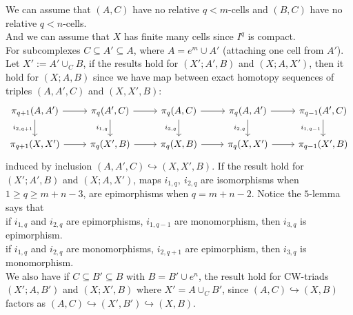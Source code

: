 \begin{prf}
        We can assume that $(A,C)$ have no relative $q<m$-cells and
        $(B,C)$ have no relative $q<n$-cells.\\
        And we can assume that $X$ has finite many cells
        since $I^q$ is compact.\\
        For subcomplexes $C \subseteq A' \subseteq A$,
        where $A = e^m \cup A'$ (attaching one cell from $A'$).\\
        Let $X' := A' \cup_C B$,
        if the results hold for $(X';A',B)$ and $(X;A,X')$,
        then it hold for $(X;A,B)$ since we have
        map between exact homotopy sequences of triples
        $(A,A',C)$ and  $(X,X',B)$:
        \[\begin{tikzcd}
            {\pi_{q+1}(A,A')} & {\pi_q(A',C)} & {\pi_q(A,C)} & {\pi_q(A,A')} & {\pi_{q-1}(A',C)} \\
            {\pi_{q+1}(X,X')} & {\pi_q(X',B)} & {\pi_q(X,B)} & {\pi_q(X,X')} & {\pi_{q-1}(X',B)}
            \arrow["{i_{2,q+1}}"', from=1-1, to=2-1]
            \arrow[from=1-1, to=1-2]
            \arrow[from=2-1, to=2-2]
            \arrow[from=2-2, to=2-3]
            \arrow[from=1-2, to=1-3]
            \arrow[from=1-3, to=1-4]
            \arrow[from=2-3, to=2-4]
            \arrow[from=1-4, to=1-5]
            \arrow[from=2-4, to=2-5]
            \arrow["{i_{1,q-1}}"', from=1-5, to=2-5]
            \arrow["{i_{2,q}}"', from=1-4, to=2-4]
            \arrow["{i_{3,q}}"', from=1-3, to=2-3]
            \arrow["{i_{1,q}}"', from=1-2, to=2-2]
        \end{tikzcd}\]
        induced by inclusion $(A,A',C) \hookrightarrow (X,X',B)$.
        If the result hold for $(X';A',B)$ and $(X;A,X')$,
        maps  $i_{1,q},\ i_{2,q}$
        are isomorphisms when $1 \geq q \geq m+n-3$,
        are epimorphisms when $q = m+n-2$.
        Notice the $5$-lemma says that\\
        if $i_{1,q}$ and $i_{2,q}$ are epimorphisms, $i_{1,q-1}$ are monomorphism, then $i_{3,q}$ is epimorphism.\\
        if $i_{1,q}$ and $i_{2,q}$ are monomorphisms, $i_{2,q+1}$ are epimorphism, then $i_{3,q}$ is monomorphism.\\
        We also have if $C \subseteq B' \subseteq B$ with $B = B' \cup e^n$,
        the result hold for CW-triads $(X';A,B')$ and $(X;X',B)$
        where $X' = A \cup_C B'$,
        since $(A,C) \hookrightarrow (X,B)$ factors as
        $(A,C) \hookrightarrow (X',B') \hookrightarrow (X,B)$.\\


\end{prf}
